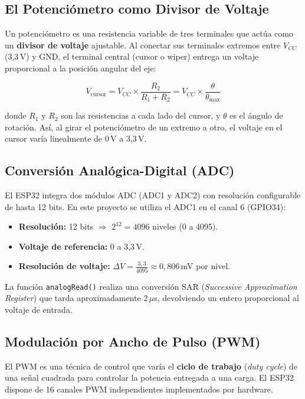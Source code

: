 \documentclass[12pt,a4paper]{article}
\begin{document}
\subsection{El Potenciómetro como Divisor de Voltaje}

Un potenciómetro es una resistencia variable de tres terminales que actúa como un \textbf{divisor de voltaje} ajustable. Al conectar sus terminales extremos entre $V_{CC}$ (3,3\,V) y GND, el terminal central (cursor o wiper) entrega un voltaje proporcional a la posición angular del eje:

\begin{equation}
V_{\text{cursor}} = V_{CC} \times \frac{R_2}{R_1 + R_2} = V_{CC} \times \frac{\theta}{\theta_{\max}}
\label{eq:divisor}
\end{equation}

donde $R_1$ y $R_2$ son las resistencias a cada lado del cursor, y $\theta$ es el ángulo de rotación. Así, al girar el potenciómetro de un extremo a otro, el voltaje en el cursor varía linealmente de 0\,V a 3,3\,V.

\subsection{Conversión Analógica-Digital (ADC)}

El ESP32 integra dos módulos ADC (ADC1 y ADC2) con resolución configurable de hasta 12 bits. En este proyecto se utiliza el ADC1 en el canal 6 (GPIO34):

\begin{itemize}
    \item \textbf{Resolución:} 12 bits $\Rightarrow$ $2^{12} = 4096$ niveles (0 a 4095).
    \item \textbf{Voltaje de referencia:} 0 a 3,3\,V.
    \item \textbf{Resolución de voltaje:} $\Delta V = \frac{3{,}3}{4095} \approx 0{,}806$\,mV por nivel.
\end{itemize}

La función \texttt{analogRead()} realiza una conversión SAR (\textit{Successive Approximation Register}) que tarda aproximadamente 2\,$\mu$s, devolviendo un entero proporcional al voltaje de entrada.

\subsection{Modulación por Ancho de Pulso (PWM)}

El PWM es una técnica de control que varía el \textbf{ciclo de trabajo} (\textit{duty cycle}) de una señal cuadrada para controlar la potencia entregada a una carga. El ESP32 dispone de 16 canales PWM independientes implementados por hardware.
\end{document}
